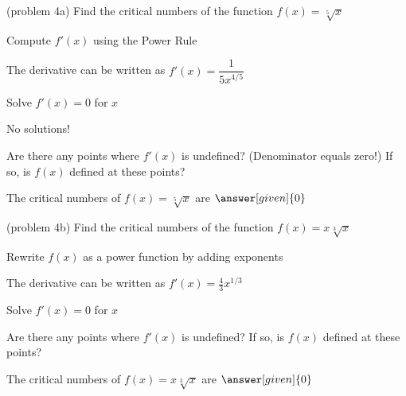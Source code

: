 \documentclass{ximera}
\begin{document}
\begin{problem}(problem 4a)
  Find the critical numbers of the function $f(x) = \sqrt[5] x$
  
  \begin{explanation}
    \begin{hint}
      Compute $f'(x)$ using the Power Rule
    \end{hint}
    \begin{hint}
      The derivative can be written as $f'(x) = \dfrac{1}{5x^{4/5}}$
    \end{hint}
		\begin{hint}
      Solve $f'(x) = 0$ for $x$
    \end{hint}
		\begin{hint}
      No solutions!
    \end{hint}
    \begin{hint}
      Are there any points where $f'(x)$ is undefined? (Denominator equals zero!)
      If so, is $f(x)$ defined at these points?  
		\end{hint}
    
    
		The critical numbers of $f(x) = \sqrt[5] x$ are
		 $\answer[given]{0}$
		\end{explanation}
\end{problem}



\begin{problem}(problem 4b)
  Find the critical numbers of the function $f(x) = x\sqrt[3]x$
  
    \begin{hint}
      Rewrite $f(x)$ as a power function by adding exponents
    \end{hint}
    \begin{hint}
      The derivative can be written as $f'(x) = \frac43 x^{1/3}$
    \end{hint}
		\begin{hint}
      Solve $f'(x) = 0$ for $x$
    \end{hint}
    \begin{hint}
      Are there any points where $f'(x)$ is undefined?
      If so, is $f(x)$ defined at these points?  
		\end{hint}
    
    
		The critical numbers of $f(x) = x\sqrt[3]x$ are
		 $\answer[given]{0}$
		
\end{problem}
\end{document}
